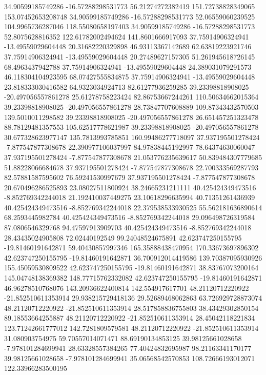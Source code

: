 34.90599185749286 -16.57288298531773 56.21274272382419 151.72738828349065 153.07452653208748
34.90599185749286 -16.57288298531773 52.06559060239525 104.9965736287046 118.55080658197403
34.90599185749286 -16.57288298531773 52.8075628816352 122.61782002494624 141.8601666917093
37.75914906324941 -13.49559029604448 20.31682220329898 46.93113367142689 62.63819223921746
37.75914906324941 -13.49559029604448 20.27489627157305 51.261945618726145 68.4963437942788
37.75914906324941 -13.49559029604448 24.389031079291573 46.118304104923595 68.07427555834875
37.75914906324941 -13.49559029604448 23.818333030416582 64.9323034924713 82.61277936259285
39.23398818908025 -20.497056557861278 25.61278758223424 82.86753667244261 110.50634662015364
39.23398818908025 -20.497056557861278 28.73847707608889 109.87343432570503 139.5010011298582
39.23398818908025 -20.497056557861278 26.651457251323478 88.78129481357553 105.62517778621987
39.23398818908025 -20.497056557861278 30.677328623977147 135.7813993785851 160.99486277718097
37.937195501278424 -7.877547877308678 22.390977106037997 84.97838445192997 78.64374630060047
37.937195501278424 -7.877547877308678 21.053776235639617 50.839484307779685 51.88228066684678
37.937195501278424 -7.877547877308678 22.700333569287793 82.57881587595602 76.59241530997679
37.937195501278424 -7.877547877308678 20.670496286525893 23.08027511800924 38.24665231211111
40.425424349473516 -8.852769342244018 21.192410037449275 23.10618296635994 40.71351261436939
40.425424349473516 -8.852769342244018 22.379538533930525 55.562181636890614 68.2593445982784
40.425424349473516 -8.852769342244018 29.096498726319584 87.0806546329768 94.47597913909703
40.425424349473516 -8.852769342244018 28.43435024905808 72.02440192549 99.24048524675891
42.623747250155795 -19.81460191642871 59.40430857997346 165.35888438470954 170.33673697896302
42.623747250155795 -19.81460191642871 36.700912014419586 139.70387095930926 155.45059530809522
42.623747250155795 -19.81460191642871 38.83767073200164 145.04748138369382 148.77715762332082
42.623747250155795 -19.81460191642871 46.96278510768076 143.20936622400814 142.554917617701
48.21120712220922 -21.852510611353914 29.938215729418136 29.52689468062863 63.726929728873074
48.21120712220922 -21.852510611353914 28.517858836755803 38.43429302850154 89.18553664255887
48.21120712220922 -21.852510611353914 28.45042118221834 123.71242661777012 142.7281809579581
48.21120712220922 -21.852510611353914 31.080903754975 59.70557014071471 88.69190134853125
39.98125661028658 -7.978101284699941 28.63328557384265 77.40424832695987 98.21163341170177
39.98125661028658 -7.978101284699941 35.06568542570853 108.72666193012071 122.33966283500195
